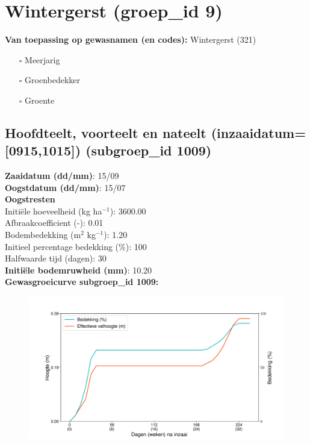 \documentclass{article}
\begin{document}
 \section{Wintergerst (groep\_id 9)} 
 \textbf{Van toepassing op gewasnamen (en codes):} Wintergerst (321) 
 \begin{multicols}{3} \begin{itemize} \item[$\square$] Meerjarig \item[$\square$] Groenbedekker \item[$\square$] Groente \end{itemize} \end{multicols} 
 \subsection{Hoofdteelt, voorteelt en nateelt (inzaaidatum=[0915,1015]) (subgroep\_id 1009)} 
  \textbf{Zaaidatum (dd/mm)}: 15/09  \vspace{0.10cm} \\ 
  \textbf{Oogstdatum (dd/mm)}: 15/07  \vspace{0.10cm} \\ 
  \textbf{Oogstresten} \vspace{0.05cm} \\ 
  \tab Initi\"{e}le hoeveelheid (kg ha$^{-1}$): 3600.00 \vspace{0.05cm} \\ 
  \tab Afbraakcoefficient (-): 0.01 \vspace{0.05cm} \\ 
  \tab Bodembedekking (m$^2$ kg$^{-1}$): 1.20 \vspace{0.05cm} \\ 
  \tab Initieel percentage bedekking (\%): 100 \vspace{0.05cm} \\ 
  \tab Halfwaarde tijd (dagen): 30 \vspace{0.05cm} \\ 
  \textbf{Initi\"{e}le bodemruwheid (mm)}: 10.20 \vspace{0.05cm} \\ 
  \textbf{Gewasgroeicurve subgroep\_id 1009:} 
 \begin{center} \begin{figure}[H] \includegraphics[width=12.5cm]{temp/1009.png} \end{figure} \end{center} 
\end{document}
